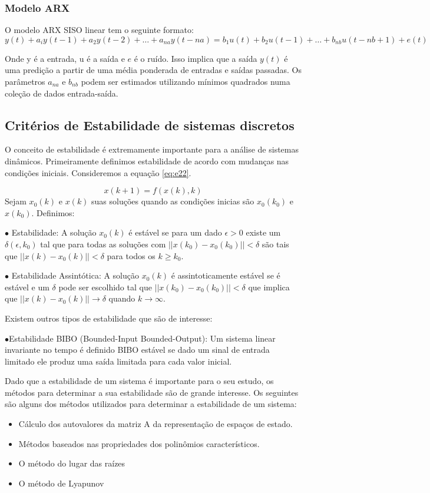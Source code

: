 \subsubsection{Modelo ARX}
O modelo ARX SISO linear tem o seguinte formato:
\begin{equation}\label{eq:ARXModel}
	y(t)+a_iy(t-1)+a_2y(t-2)+\dots+a_{na}y(t-na)=
	b_1u(t)+b_2u(t-1)+\dots+b_{nb}u(t-nb+1)+e(t)
\end{equation}

Onde y é a entrada, u é a saída e $e$ é o ruído. Isso implica que a saída $y(t)$ é uma predição a partir de uma média ponderada de entradas e saídas passadas. Os parâmetros $a_{na}$ e $b_{nb}$ podem ser estimados utilizando mínimos quadrados numa coleção de dados entrada-saída.

\subsection{Critérios de Estabilidade de sistemas discretos}

O conceito de estabilidade é extremamente importante para a análise de sistemas dinâmicos. Primeiramente definimos  estabilidade de acordo com mudanças nas condições iniciais. Consideremos a equação \eqref{eq:e22}.

\begin{equation} \label{eq:e22}
x(k+1)=f(x(k),k)
\end{equation}
Sejam $x_0(k)$ e $x(k)$ suas soluções quando as condições inicias são $x_0(k_0)$ e $x(k_0)$. Definimos:


$\bullet$ Estabilidade: A solução $x_0(k)$ é estável se para um dado $\epsilon>0$ existe um $\delta(\epsilon,k_0)$ tal que para todas as soluções com $||x(k_0)-x_0(k_0)||<\delta$ são tais que $||x(k)-x_0(k)||<\delta$ para todos os $k \geqslant k_0$.


$\bullet$ Estabilidade Assintótica: A solução $x_0(k)$ é assintoticamente estável se é estável e um $\delta$ pode ser escolhido tal que  $||x(k_0)-x_0(k_0)||<\delta$ que implica que $||x(k)-x_0(k)||\to\delta$ quando $k \to \infty$.


Existem outros tipos de estabilidade que são de interesse:


$\bullet$Estabilidade BIBO (Bounded-Input Bounded-Output): Um sistema linear invariante no tempo é definido BIBO estável se dado um sinal de entrada limitado ele produz uma saída limitada para cada valor inicial.


Dado que a estabilidade de um sistema é importante para o seu estudo, os métodos para determinar a sua estabilidade são de grande interesse. Os seguintes são alguns dos métodos utilizados para determinar a estabilidade de um sistema:
\begin{itemize}
	\item Cálculo dos autovalores da matriz A da representação de espaços de estado.
	\item Métodos baseados nas propriedades dos polinômios característicos.
	\item O método do lugar das raízes
	\item O método de Lyapunov
\end{itemize}

